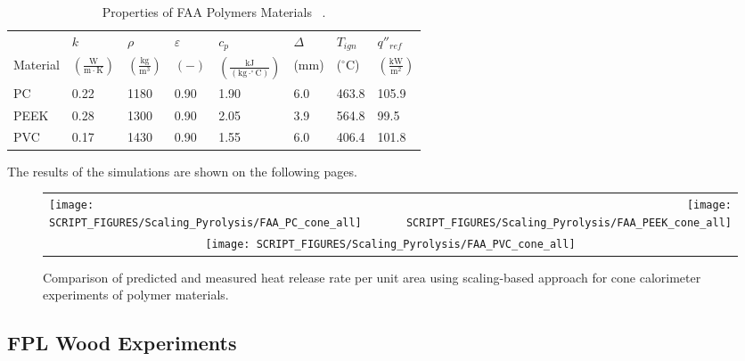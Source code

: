 \begin{table}[!h]
\caption[Properties of FAA Polymers Materials]{Properties of FAA Polymers Materials ~\cite{Stoliarov:CF2009,Stoliarov:FM2012}.}
\centering
\begin{tabular}{|p{5.5cm}|p{1.0cm}|p{1.0cm}|p{0.8cm}|p{1.4cm}|p{1.0cm}|p{1.0cm}|p{1.2cm}|}
\hline
                                               & $k$    & $\rho$      & $\varepsilon$   & $c_{p}$ & $\Delta$    & $T_{ign}$ & $q''_{ref}$ \\
Material                                       & $\mathrm{\left(\frac{W}{m\cdot K}\right)}$ & $\mathrm{\left(\frac{kg}{m^{3}}\right)}$ & $\mathrm{( - )}$ & $\mathrm{\left(\frac{kJ}{(kg\cdot ^{\circ}C)}\right)}$ &  ($\mathrm{mm}$)   & ($\mathrm{^{\circ}C}$) & $\mathrm{\left(\frac{kW}{m^{2}}\right)}$ \\ \hline
\hline
PC  & 0.22 & 1180 & 0.90 & 1.90 & 6.0 & 463.8 & 105.9 \\ \hline
PEEK  & 0.28 & 1300 & 0.90 & 2.05 & 3.9 & 564.8 & 99.5 \\ \hline
PVC  & 0.17 & 1430 & 0.90 & 1.55 & 6.0 & 406.4 & 101.8 \\ \hline
\end{tabular}
\label{Properties_FAA_Polymers_Materials_polymers}
\end{table}

The results of the simulations are shown on the following pages.

\begin{figure}[!htbp]
\begin{tabular*}{\textwidth}{l@{\extracolsep{\fill}}r}
\texttt{[image: SCRIPT\_FIGURES/Scaling\_Pyrolysis/FAA\_PC\_cone\_all]} &
\texttt{[image: SCRIPT\_FIGURES/Scaling\_Pyrolysis/FAA\_PEEK\_cone\_all]} \\
\multicolumn{2}{c}{\texttt{[image: SCRIPT\_FIGURES/Scaling\_Pyrolysis/FAA\_PVC\_cone\_all]}}
\end{tabular*}
\caption[HRRPUA of FAA Polymers materials using scaling model]
{Comparison of predicted and measured heat release rate per unit area using scaling-based approach for cone calorimeter experiments of polymer materials.}
\label{FAA_Polymers_HRR_polymers}
\end{figure}

\clearpage

\subsection{FPL Wood Experiments}\label{sec_FPL_Woods_Materials}

